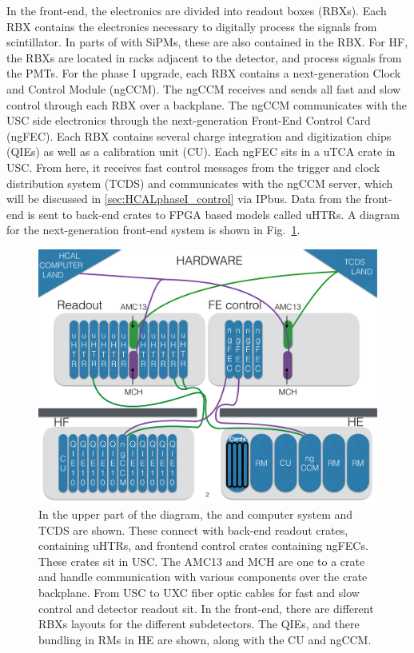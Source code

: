 In the front-end, the \HCAL electronics are divided into readout boxes (RBXs). Each RBX contains the electronics necessary to digitally process the signals from scintillator. In parts of \HCAL with SiPMs, these are also contained in the RBX. For HF, the RBXs are located in racks adjacent to the detector, and process signals from the PMTs. For the \HCAL phase I upgrade, each RBX contains a next-generation Clock and Control Module (ngCCM).  The ngCCM receives and sends all fast and slow control through each RBX over a backplane.  The ngCCM communicates with the USC side electronics through the next-generation Front-End Control Card (ngFEC).  Each RBX contains several charge integration and digitization chips (QIEs) as well as a calibration unit (CU). Each ngFEC sits in a uTCA crate in USC.  From here, it receives fast control messages from the trigger and clock distribution system (TCDS) and communicates with the ngCCM server, which will be discussed in \ref{sec:HCALphaseI_control} via IPbus.  Data from the front-end is sent to back-end crates to FPGA based models called uHTRs. A diagram for the next-generation front-end system is shown in Fig.~\ref{fig:HCALngFElayout}.
\begin{figure}[!tp]
    \centering
    \includegraphics[width=\textwidth]{figures/HCALngFElayout.pdf}
    \caption[
       \HCAL Phase I Upgrade Control and Readout Layout.
    ]{
        In the upper part of the diagram, the \HCAL and computer system and TCDS are shown.  These connect with back-end readout crates, containing uHTRs, and frontend control crates containing ngFECs.  These crates sit in USC.  The AMC13 and MCH are one to a crate and handle communication with various components over the crate backplane. From USC to UXC fiber optic cables for fast and slow control and detector readout sit.  In the front-end, there are different RBXs layouts for the different \HCAL subdetectors.  The QIEs, and there bundling in RMs in HE are shown, along with the CU and ngCCM.
    }
    \label{fig:HCALngFElayout}
\end{figure}

